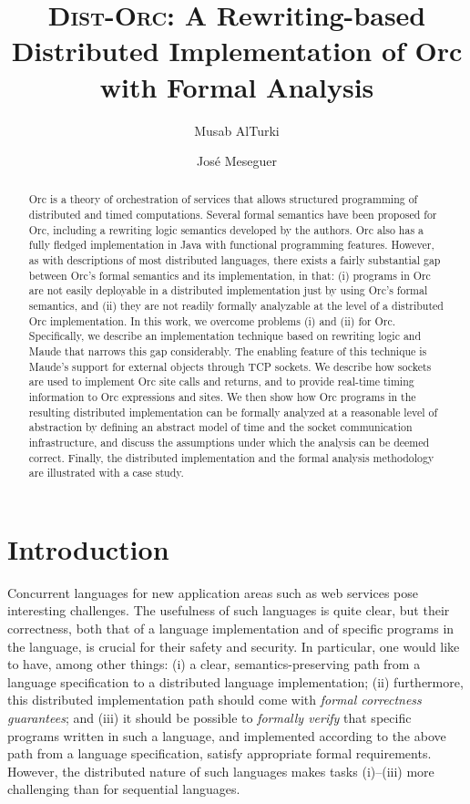 \documentclass{eptcs}
\title{\textsc{Dist-Orc}: A Rewriting-based Distributed Implementation of Orc with Formal Analysis}
\author{Musab AlTurki
   \institute{The University of Illinois at Urbana-Champaign,\\ 
              Urbana IL 61801, USA}
   \email{alturki@cs.illinois.edu}   
\and Jos{\'e} Meseguer
   \institute{The University of Illinois at Urbana-Champaign,\\ 
              Urbana IL 61801, USA}
   \email{meseguer@cs.illinois.edu}
}
\begin{document}
\maketitle              

\begin{abstract}

Orc is a theory of orchestration of services that allows structured programming of  distributed and timed computations. Several formal semantics have been proposed for Orc, including a rewriting logic semantics developed by the authors. Orc also has a fully fledged implementation in Java with functional programming features. However, as with descriptions of most distributed languages, there exists a fairly substantial gap between Orc's formal semantics and its implementation, in that: (i) programs in Orc are not easily deployable in a distributed implementation just by using Orc's formal semantics, and (ii) they are not readily formally analyzable at the level of a distributed Orc implementation. In this work, we overcome problems (i) and (ii) for Orc. Specifically, we describe an implementation technique based on rewriting logic and Maude that narrows this gap considerably. The enabling feature of this technique is Maude's support for external objects through TCP sockets. We describe how sockets are used to implement Orc site calls and returns, and to provide real-time timing information to Orc expressions and sites. We then show how Orc programs in the resulting distributed implementation can be formally analyzed at a reasonable level of abstraction by defining an abstract model of time and the socket communication infrastructure, and discuss the assumptions under which the analysis can be deemed correct. Finally, the distributed implementation and the formal analysis methodology are illustrated with a case study.   


   
\end{abstract}

\section{Introduction}

Concurrent languages for new application areas such as web services
pose interesting challenges.  The usefulness of such languages is
quite clear, but their correctness, both that of a language
implementation and of specific programs in the language, is crucial
for their safety and security.  In particular, one would like to have,
among other things: (i) a clear, semantics-preserving path from a
language specification to a distributed language implementation; (ii)
furthermore, this distributed implementation  path should come
with \emph{formal  correctness guarantees}; and (iii) it
should be possible to \emph{formally verify} that specific programs
written in such a language, and implemented according to the above
path from a language specification, satisfy appropriate formal
requirements.  However, the distributed nature of such languages makes
tasks (i)--(iii) more challenging than for sequential languages.
\end{document}
